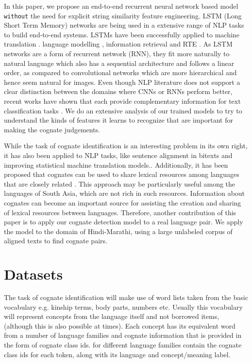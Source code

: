 \documentclass[11pt,letterpaper]{article}
\begin{document}
In this paper, we propose an end-to-end recurrent neural network based model \texttt{without} the need for explicit string similarity feature engineering. LSTM (Long Short Term Memory) networks are being used in a extensive range of NLP tasks to build end-to-end systems. LSTMs have been successfully applied to machine translation \citep{bahdanau2014neural}. language modelling \citep{mikolov2010recurrent}, information retrieval \citep{sordoni2015hierarchical} and RTE \citep{snli:emnlp2015}. As LSTM networks are a form of recurrent network (RNN), they fit more naturally to natural language which also has a sequential architecture and follows a linear order, as compared to convolutional networks which are more hierarchical and hence seem natural for images. Even though NLP literature does not support a clear distinction between the domains where CNNs or RNNs perform better, recent works have shown that each provide complementary information for text classification tasks \citep{yin2017comparative}. We do an extensive analysis of our trained models to try to understand the kinds of features it learns to recognize that are important for making the cognate judgements.

While the task of cognate identification is an interesting problem in its own right, it has also been applied to NLP tasks, like sentence alignment in bitexts and improving statistical machine translation models.\cite{Kondrak:2003,Simard:1993:UCA:962367.962411}. Additionally, it has been proposed that cognates can be used to share lexical resources among languages that are closely related \citep{Singh:07b}. This approach may be particularly useful among the languages of South Asia, which are not rich in such resources. Information about cognates can become an important source for assisting the creation and sharing of lexical resources between languages. Therefore, another contribution of this paper is to apply our cognate detection model to a real language pair. We apply the model to the domain of Hindi-Marathi, using a large unlabeled corpus of aligned texts to find cognate pairs.



\section{Datasets}

The task of cognate identification will make use of word lists taken from the basic vocabulary e.g. kinship terms, body parts, numbers etc. Usually this vocabulary will represent concepts from the language itself and not borrowed items, (although this is also possible at times). Each concept has its equivalent word from a number of language families and cognate information that is provided in the form of cognate class ids.
for different language families contain the cognate class ids for each token, along with its language and concept/meaning label. 
\end{document}

